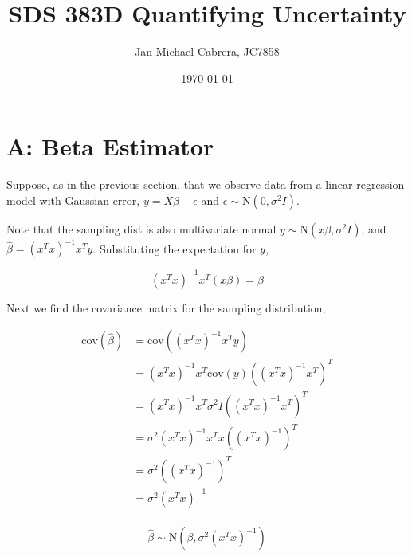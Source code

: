 \documentclass[12pt]{article}
\newcommand{\cov}{\text{cov}}
\begin{document}
    \title{SDS 383D Quantifying Uncertainty}
    \author{Jan-Michael Cabrera, JC7858}
    \date{\today}
    \maketitle

    \section*{A: Beta Estimator}

        Suppose, as in the previous section, that we observe data from a linear regression model with Gaussian error, $y = X \beta + \epsilon$ and $\epsilon \sim \text{N}(0, \sigma^2 I)$.

        Note that the sampling dist is also multivariate normal $y \sim \text{N}(x \beta, \sigma^2 I)$, and $\hat{\beta} = (x^T x)^{-1} x^T y$. Substituting the expectation for $y$, 

        \begin{equation}
            (x^T x)^{-1} x^T (x \beta) = \beta
        \end{equation}

        Next we find the covariance matrix for the sampling distribution, 

        \begin{align}
            \cov(\hat{\beta}) &= \cov( (x^Tx)^{-1} x^T y) \\
            & = (x^Tx)^{-1} x^T \cov(y) ((x^Tx)^{-1} x^T )^T \\
            & = (x^Tx)^{-1} x^T \sigma^2 I ((x^Tx)^{-1} x^T )^T \\
            & = \sigma^2 (x^Tx)^{-1} x^T x ((x^Tx)^{-1} )^T \\
            & = \sigma^2 ((x^Tx)^{-1} )^T \\
            & = \sigma^2 (x^Tx)^{-1} \\
        \end{align}

        \begin{equation}
            \hat{\beta} \sim \text{N}(\beta, \sigma^2 (x^Tx)^{-1})
        \end{equation}
\end{document}
